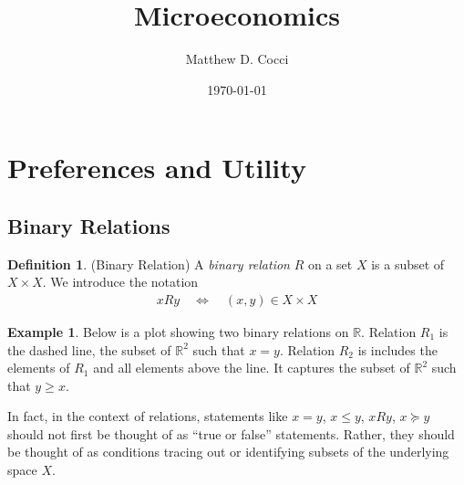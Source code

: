 \documentclass[12pt]{article}
\author{Matthew D. Cocci}
\title{Microeconomics}
\date{\today}
\theoremstyle{plain}
\theoremstyle{definition}
\newtheorem{defn}[thm]{Definition}
\newtheorem{ex}[thm]{Example}
\theoremstyle{remark}
\newcommand{\R}{\mathbb{R}}
\begin{document}
\maketitle
\tableofcontents


\clearpage
\section{Preferences and Utility}

\subsection{Binary Relations}

\begin{defn}(Binary Relation)
A \emph{binary relation} $R$ on a set $X$ is a subset of $X\times X$. We
introduce the notation
\begin{align*}
  xRy
  \quad\iff\quad
  (x,y) \in X \times X
\end{align*}
\end{defn}

\begin{ex}
Below is a plot showing two binary relations on $\R$. Relation $R_1$ is
the dashed line, the subset of $\R^2$ such that $x=y$. Relation $R_2$ is
includes the elements of $R_1$ and all elements above the line. It
captures the subset of $\R^2$ such that $y\geq x$.

In fact, in the context of relations, statements like $x=y$, $x\leq y$,
$xRy$, $x\succeq y$ should not first be thought of as ``true or false''
statements. Rather, they should be thought of as conditions tracing out
or identifying subsets of the underlying space $X$.
\begin{figure}[htpb!]
\centering
{}
\end{figure}
\end{ex}
\end{document}
